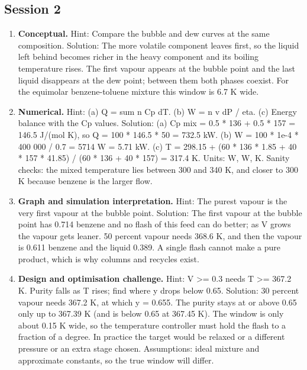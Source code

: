 \documentclass[11pt,a4paper]{article}
\begin{document}
\subsection*{Session 2}
\begin{enumerate}[nosep]
\item \textbf{Conceptual.} Hint: Compare the bubble and dew curves at the same composition. Solution: The more volatile component leaves first, so the liquid left behind becomes richer in the heavy component and its boiling temperature rises. The first vapour appears at the bubble point and the last liquid disappears at the dew point; between them both phases coexist. For the equimolar benzene-toluene mixture this window is 6.7 K wide.
\item \textbf{Numerical.} Hint: (a) Q = sum n Cp dT. (b) W = n v dP / eta. (c) Energy balance with the Cp values. Solution: (a) Cp mix = 0.5 * 136 + 0.5 * 157 = 146.5 J/(mol K), so Q = 100 * 146.5 * 50 = 732.5 kW. (b) W = 100 * 1e-4 * 400 000 / 0.7 = 5714 W = 5.71 kW. (c) T = 298.15 + (60 * 136 * 1.85 + 40 * 157 * 41.85) / (60 * 136 + 40 * 157) = 317.4 K. Units: W, W, K. Sanity checks: the mixed temperature lies between 300 and 340 K, and closer to 300 K because benzene is the larger flow.
\item \textbf{Graph and simulation interpretation.} Hint: The purest vapour is the very first vapour at the bubble point. Solution: The first vapour at the bubble point has 0.714 benzene and no flash of this feed can do better; as V grows the vapour gets leaner. 50 percent vapour needs 368.6 K, and then the vapour is 0.611 benzene and the liquid 0.389. A single flash cannot make a pure product, which is why columns and recycles exist.
\item \textbf{Design and optimisation challenge.} Hint: V \textgreater{}= 0.3 needs T \textgreater{}= 367.2 K. Purity falls as T rises; find where y drops below 0.65. Solution: 30 percent vapour needs 367.2 K, at which y = 0.655. The purity stays at or above 0.65 only up to 367.39 K (and is below 0.65 at 367.45 K). The window is only about 0.15 K wide, so the temperature controller must hold the flash to a fraction of a degree. In practice the target would be relaxed or a different pressure or an extra stage chosen. Assumptions: ideal mixture and approximate constants, so the true window will differ.
\end{enumerate}
\end{document}
